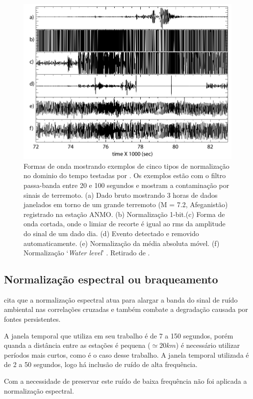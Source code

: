 \begin{figure}[!ht]
\centering
\includegraphics[scale=0.5]{temporal_norma.png}
\caption{Formas de onda mostrando exemplos de cinco tipos de normalização no dominio do tempo testadas por \cite{bensen_processing_2007}. Os exemplos estão com o filtro passa-banda entre 20 e 100 segundos e mostram a contaminação por sinais de terremoto. (a)  Dado bruto mostrando 3 horas de dados janelados em torno de um grande terremoto (M = 7.2, Afeganistão) registrado na estação ANMO. (b) Normalização 1-bit.(c) Forma de onda cortada, onde o limiar de recorte é igual ao rms da amplitude do sinal de um dado dia. (d) Evento detectado e removido automaticamente. (e) Normalização da média absoluta móvel. (f) Normalização ‘\textit{Water level}’ . Retirado de \cite{bensen_processing_2007}.}
\label{temporal_norma}
\end{figure} 

\subsection{Normalização espectral ou braqueamento}

\cite{bensen_processing_2007} cita que a normalização espectral atua para alargar a banda do sinal de ruído ambiental nas correlações cruzadas e também combate a degradação causada por fontes persistentes.

A janela temporal que \cite{bensen_processing_2007} utiliza em seu trabalho é de 7 a 150 segundos, porém quanda a distância entre as estações é pequena ($\simeq 20 km$) é necessário utilizar períodos mais curtos, como é o caso desse trabalho. A janela temporal utilizada é de 2 a 50 segundos, logo há inclusão de ruído de alta frequência.

Com a necessidade de preservar este ruído de baixa frequência não foi aplicada a normalização espectral. 


